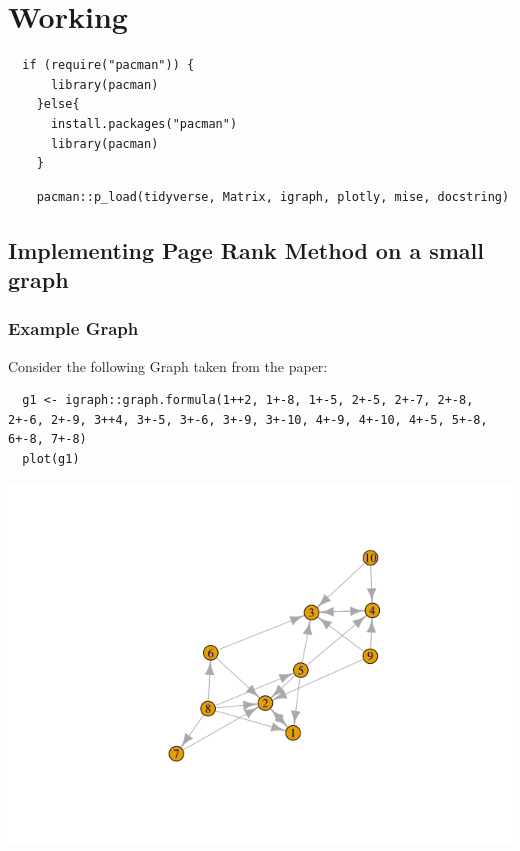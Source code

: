 \documentclass[11pt]{article}
\begin{document}
\section{Working}
\label{sec:org53d06b1}
\begin{verbatim}
  if (require("pacman")) {
      library(pacman)
    }else{
      install.packages("pacman")
      library(pacman)
    }
\end{verbatim}
\begin{verbatim}
    pacman::p_load(tidyverse, Matrix, igraph, plotly, mise, docstring)
\end{verbatim}

\subsection{Implementing Page Rank Method on a small graph}
\label{sec:orgd1c7271}
\subsubsection{Example Graph}
\label{sec:orgb098a3f}
Consider the following Graph taken from the paper:

\begin{verbatim}
  g1 <- igraph::graph.formula(1++2, 1+-8, 1+-5, 2+-5, 2+-7, 2+-8, 2+-6, 2+-9, 3++4, 3+-5, 3+-6, 3+-9, 3+-10, 4+-9, 4+-10, 4+-5, 5+-8, 6+-8, 7+-8)
  plot(g1)
\end{verbatim}

\begin{center}
\includegraphics[width=.9\linewidth]{ImplementingPageRank/01PageRank_files/figure-html/unnamed-chunk-2-1.png}
\end{center}
\end{document}
